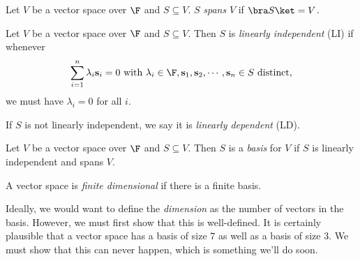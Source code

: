 \documentclass[a4paper]{article}
\begin{document}
\begin{defi}
  Let $V$ be a vector space over $\F$ and $S\subseteq V$. $S$ \emph{spans} $V$ if $\bra S\ket = V$.
\end{defi}

\begin{defi}
  Let $V$ be a vector space over $\F$ and $S\subseteq V$. Then $S$ is \emph{linearly independent} (LI) if whenever
  \[
    \sum_{i = 1}^n \lambda_i \mathbf{s}_i = 0\text{ with } \lambda_i \in \F, \mathbf{s}_1, \mathbf{s}_2, \cdots, \mathbf{s}_n \in S\text{ distinct},
  \]
  we must have $\lambda_i = 0$ for all $i$.

  If $S$ is not linearly independent, we say it is \emph{linearly dependent} (LD).
\end{defi}

\begin{defi}[Basis]
  Let $V$ be a vector space over $\F$ and $S\subseteq V$. Then $S$ is a \emph{basis} for $V$ if $S$ is linearly independent and spans $V$.
\end{defi}

\begin{defi}
  A vector space is \emph{finite dimensional} if there is a finite basis.
\end{defi}
Ideally, we would want to define the \emph{dimension} as the number of vectors in the basis. However, we must first show that this is well-defined. It is certainly plausible that a vector space has a basis of size $7$ as well as a basis of size $3$. We must show that this can never happen, which is something we'll do soon.
\end{document}
